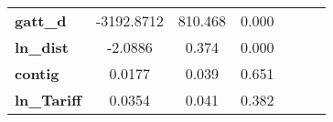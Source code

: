 \begin{center}
\begin{tabular}{lcccccc}
\textbf{gatt\_d}                                                   &   -3192.8712  &      810.468     &        0.000\\
\textbf{ln\_dist}                                                  &      -2.0886  &        0.374     &        0.000\\
\textbf{contig}                                                    &       0.0177  &        0.039     &        0.651\\
\textbf{ln\_Tariff}                                                &       0.0354  &        0.041     &        0.382\\
\bottomrule
\end{tabular}
\end{center}